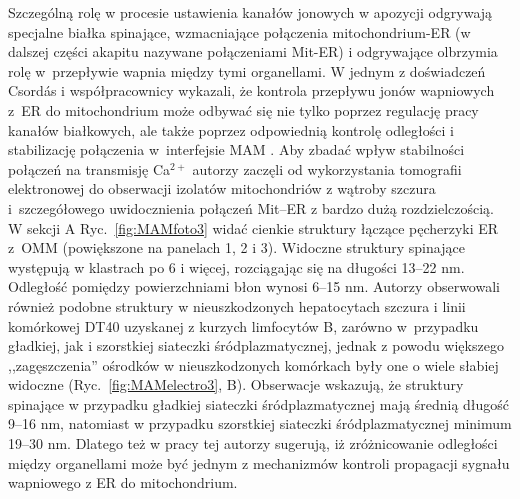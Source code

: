 Szczególną rolę w procesie ustawienia kanałów jonowych w apozycji odgrywają specjalne białka spinające, wzmacniające połączenia mitochondrium-ER (w dalszej części akapitu nazywane połączeniami Mit-ER) i odgrywające olbrzymia rolę w~przepływie wapnia między tymi organellami. W jednym z doświadczeń Csord\'{a}s i współpracownicy wykazali, że kontrola przepływu jonów wapniowych z~ER do mitochondrium może odbywać się nie tylko poprzez regulację pracy kanałów białkowych, ale także poprzez odpowiednią kontrolę odległości i stabilizację połączenia w~interfejsie MAM \cite{Csordas2006}. Aby zbadać wpływ stabilności połączeń na transmisję Ca$^{2+}$ autorzy zaczęli od wykorzystania tomografii elektronowej do obserwacji izolatów mitochondriów z wątroby szczura i~szczegółowego uwidocznienia połączeń Mit--ER z bardzo dużą rozdzielczością. W sekcji A Ryc.~\ref{fig:MAMfoto3} widać cienkie struktury łączące pęcherzyki ER z~OMM (powiększone na panelach 1, 2 i 3). Widoczne struktury spinające występują w klastrach po 6 i więcej, rozciągając się na długości 13--22 nm. Odległość pomiędzy powierzchniami błon wynosi 6--15 nm. Autorzy obserwowali również podobne struktury w nieuszkodzonych hepatocytach szczura i linii komórkowej DT40 uzyskanej z kurzych limfocytów B, zarówno w~przypadku gładkiej, jak i szorstkiej siateczki śródplazmatycznej, jednak z powodu większego ,,zagęszczenia'' ośrodków w nieuszkodzonych komórkach były one o wiele słabiej widoczne (Ryc.~\ref{fig:MAMelectro3}, B). Obserwacje wskazują, że struktury spinające w przypadku gładkiej siateczki śródplazmatycznej mają średnią długość 9--16 nm, natomiast w przypadku szorstkiej siateczki śródplazmatycznej minimum 19--30 nm. Dlatego też w pracy tej autorzy sugerują, iż zróżnicowanie odległości między organellami może być jednym z mechanizmów kontroli propagacji sygnału wapniowego z ER do mitochondrium.

